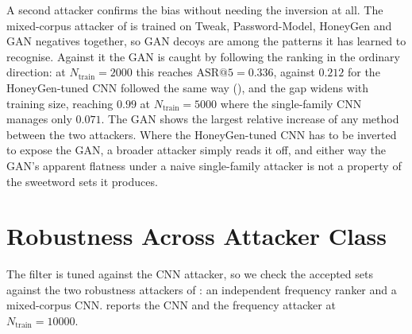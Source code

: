 A second attacker confirms the bias without needing the inversion at
all. The mixed-corpus attacker of
 is trained on Tweak,
Password-Model, HoneyGen and GAN negatives together, so GAN decoys are
among the patterns it has learned to recognise. Against it the GAN is
caught by following the ranking in the ordinary direction: at
$N_{\text{train}} = 2000$ this reaches $\mathrm{ASR}@5 = 0.336$, against
$0.212$ for the HoneyGen-tuned CNN followed the same way
(), and the gap widens with training size, reaching
$0.99$ at $N_{\text{train}} = 5000$ where the single-family CNN manages
only $0.071$. The GAN shows the largest relative increase of any method
between the two attackers. Where the HoneyGen-tuned CNN has to be
inverted to expose the GAN, a broader attacker simply reads it off, and
either way the GAN's apparent flatness under a naive single-family
attacker is not a property of the sweetword sets it produces.


\section{Robustness Across Attacker Class}
\label{sec:results-freq}

The filter is tuned against the CNN attacker, so we check the accepted
sets against the two robustness attackers of
: an independent frequency ranker
and a mixed-corpus CNN.  reports the CNN and the
frequency attacker at $N_{\text{train}} = 10000$.



